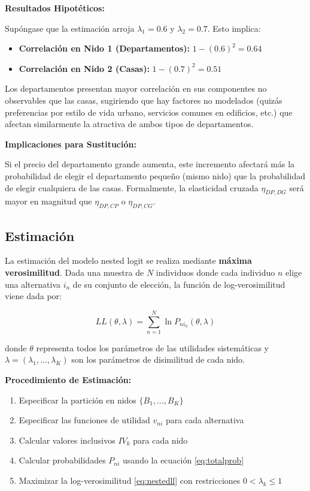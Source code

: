 \documentclass[
]{book}
\providecommand{\tightlist}{%
  \setlength{\itemsep}{0pt}\setlength{\parskip}{0pt}}
\begin{document}
\textbf{Resultados Hipotéticos:}

Supóngase que la estimación arroja \(\lambda_1 = 0.6\) y \(\lambda_2 = 0.7\). Esto implica:

\begin{itemize}
\tightlist
\item
  \textbf{Correlación en Nido 1 (Departamentos):} \(1 - (0.6)^2 = 0.64\)
\item
  \textbf{Correlación en Nido 2 (Casas):} \(1 - (0.7)^2 = 0.51\)
\end{itemize}

Los departamentos presentan mayor correlación en sus componentes no observables que las casas, sugiriendo que hay factores no modelados (quizás preferencias por estilo de vida urbano, servicios comunes en edificios, etc.) que afectan similarmente la atractiva de ambos tipos de departamentos.

\textbf{Implicaciones para Sustitución:}

Si el precio del departamento grande aumenta, este incremento afectará más la probabilidad de elegir el departamento pequeño (mismo nido) que la probabilidad de elegir cualquiera de las casas. Formalmente, la elasticidad cruzada \(\eta_{DP,DG}\) será mayor en magnitud que \(\eta_{DP,CP}\) o \(\eta_{DP,CG}\).

\hypertarget{estimaciuxf3n-3}{%
\subsection{Estimación}\label{estimaciuxf3n-3}}

La estimación del modelo nested logit se realiza mediante \textbf{máxima verosimilitud}. Dada una muestra de \(N\) individuos donde cada individuo \(n\) elige una alternativa \(i_n\) de su conjunto de elección, la función de log-verosimilitud viene dada por:

\begin{equation}
LL(\theta, \lambda) = \sum_{n=1}^N \ln P_{ni_n}(\theta, \lambda)
\label{eq:nestedll}
\end{equation}

donde \(\theta\) representa todos los parámetros de las utilidades sistemáticas y \(\lambda = (\lambda_1, ..., \lambda_K)\) son los parámetros de disimilitud de cada nido.

\textbf{Procedimiento de Estimación:}

\begin{enumerate}
\def\labelenumi{\arabic{enumi}.}
\tightlist
\item
  Especificar la partición en nidos \(\{B_1, ..., B_K\}\)
\item
  Especificar las funciones de utilidad \(v_{ni}\) para cada alternativa
\item
  Calcular valores inclusivos \(IV_k\) para cada nido
\item
  Calcular probabilidades \(P_{ni}\) usando la ecuación \eqref{eq:totalprob}
\item
  Maximizar la log-verosimilitud \eqref{eq:nestedll} con restricciones \(0 < \lambda_k \leq 1\)
\end{enumerate}
\end{document}
